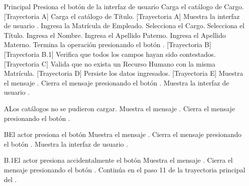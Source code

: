 \begin{UCtrayectoria}{Principal}
    \UCpaso[\UCactor] Presiona el botón  de la interfaz de usuario 
    \UCpaso Carga el catálogo de Cargo. [Trayectoria A]
    \UCpaso Carga el catálogo de Título. [Trayectoria A]
    \UCpaso Muestra la interfaz de usuario .
    \UCpaso[\UCactor] Ingresa la Matrícula de Empleado.
    \UCpaso[\UCactor] Selecciona el Cargo.
    \UCpaso[\UCactor] Selecciona el Título.
    \UCpaso[\UCactor] Ingresa el Nombre.
    \UCpaso[\UCactor] Ingresa el Apellido Paterno.
    \UCpaso[\UCactor] Ingresa el Apellido Materno.
    \UCpaso[\UCactor] Termina la operación presionando el botón . [Trayectoria B] [Trayectoria B.1]
    \UCpaso Verifica que todos los campos hayan sido contestados. [Trayectoria C]
    \UCpaso Valida que no exista un Recurso Humano con la misma Matrícula. [Trayectoria D]
    \UCpaso Persiste los datos ingresados. [Trayectoria E]
    \UCpaso Muestra el mensaje .
    \UCpaso[\UCactor] Cierra el mensaje presionando el botón .
    \UCpaso Muestra la interfaz de usuario .
\end{UCtrayectoria}
\begin{UCtrayectoriaA}{A}{Los catálogos no se pudieron cargar.}
    \UCpaso Muestra el mensaje .
    \UCpaso[\UCactor] Cierra el mensaje presionando el botón .
\end{UCtrayectoriaA}
\begin{UCtrayectoriaA}{B}{El actor presiona el botón }
    \UCpaso Muestra el mensaje .
    \UCpaso[\UCactor] Cierra el mensaje presionando el botón .
    \UCpaso Muestra la interfaz de usuario .
\end{UCtrayectoriaA}
\begin{UCtrayectoriaA}{B.1}{El actor presiona accidentalmente el botón }
    \UCpaso Muestra el mensaje .
    \UCpaso[\UCactor] Cierra el mensaje presionando el botón .
    \UCpaso Continúa en el paso 11 de la trayectoria principal del .
\end{UCtrayectoriaA}
